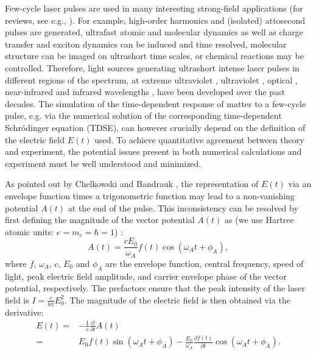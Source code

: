 Few-cycle laser pulses are used in many interesting strong-field applications (for reviews, see e.g., \cite{popmintchev2010,suzuki2014,vrakking2014,pazourek2015,wang2015,xu2016}). For example, high-order harmonics and (isolated) attosecond pulses are generated, ultrafast atomic and molecular dynamics as well as charge transfer and exciton dynamics can be induced and time resolved, molecular structure can be imaged on ultrashort time scales, or chemical reactions may be controlled. Therefore, light sources generating ultrashort intense laser pulses in different regions of the spectrum, at extreme ultraviolet \cite{goulielmakis2008}, ultraviolet \cite{durfee1999}, optical \cite{fork1987}, near-infrared \cite{zhou1994,nisoli1996,nisoli1997} and infrared wavelengths \cite{ishii2014,pupeza2015,li2016}, have been developed over the past decades.  The simulation of the time-dependent response of matter to a few-cycle pulse, e.g. via the numerical solution of the corresponding time-dependent Schr\"odinger equation (TDSE), can however crucially depend on the definition of the electric field $E(t)$ used. To achieve quantitative agreement between theory and experiment, the potential issues present in both numerical calculations and experiment must be well understood and minimized.

As pointed out by Chelkowski and Bandrauk \cite{chelkowski2002}, the representation of $E(t)$ via an envelope function times a trigonometric function may lead to a non-vanishing potential $A(t)$ at the end of the pulse. This inconsistency can be resolved by first defining the magnitude of the vector potential $A(t)$ as (we use Hartree atomic units: $e = m_e = \hbar =1$) \cite{chelkowski2002}: 
\begin{equation}
A(t) = \frac{c E_0}{\omega_A}f(t) \cos(\omega_A t +\phi_A),
\label{eq:vectorp}
\end{equation}
where $f$, $\omega_A$, $c$, $E_0$ and $\phi_A$ are the envelope function, central frequency, speed of light, peak electric field amplitude, and carrier envelope phase of the vector potential, respectively.
The prefactors ensure that the peak intensity of the laser field is $I = \tfrac{c}{8\pi}E_0^2$.
The magnitude of the electric field is then obtained via the derivative:
\begin{equation}
\begin{split}
\label{eq:efield}
E(t) =& -\frac{1}{c}\frac{\partial}{\partial t}A(t)
\\
=&E_0f(t) \sin(\omega_A t +\phi_A)
-\frac{E_0}{\omega_A}\frac{\partial f(t)}{\partial t}
\cos(\omega_A t +\phi_A).
\end{split}
\end{equation}

